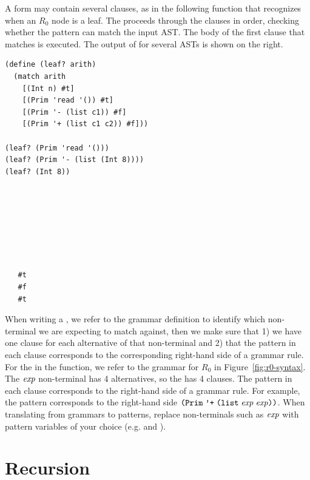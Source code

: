 \documentclass[11pt]{book}
\begin{document}
A  form may contain several clauses, as in the following
function  that recognizes when an $R_0$ node is
a leaf. The  proceeds through the clauses in order,
checking whether the pattern can match the input AST. The
body of the first clause that matches is executed. The output of
 for several ASTs is shown on the right.
\begin{center}
\begin{minipage}{0.6\textwidth}
\begin{lstlisting}
(define (leaf? arith)
  (match arith
    [(Int n) #t]
    [(Prim 'read '()) #t]
    [(Prim '- (list c1)) #f]
    [(Prim '+ (list c1 c2)) #f]))

(leaf? (Prim 'read '()))
(leaf? (Prim '- (list (Int 8))))
(leaf? (Int 8))
\end{lstlisting}
\end{minipage}
\vrule
\begin{minipage}{0.25\textwidth}
  \begin{lstlisting}






    
   #t
   #f
   #t
\end{lstlisting}
\end{minipage}
\end{center}

When writing a , we refer to the grammar definition to
identify which non-terminal we are expecting to match against, then we
make sure that 1) we have one clause for each alternative of that
non-terminal and 2) that the pattern in each clause corresponds to the
corresponding right-hand side of a grammar rule. For the 
in the  function, we refer to the grammar for $R_0$ in
Figure~\ref{fig:r0-syntax}. The $\mathit{exp}$ non-terminal has 4
alternatives, so the  has 4 clauses.  The pattern in each
clause corresponds to the right-hand side of a grammar rule. For
example, the pattern  corresponds to the
right-hand side $\texttt{(Prim}\;\texttt{'+}\;\texttt{(list}\;\mathit{exp}\;\mathit{exp}\texttt{))}$. When translating from grammars to
patterns, replace non-terminals such as $\mathit{exp}$ with pattern variables
of your choice (e.g.  and ).


\section{Recursion}
\label{sec:recursion}
\end{document}
